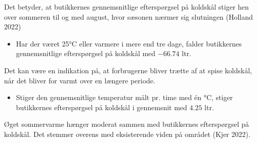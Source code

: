 \documentclass[
  12pt,
  a4paper,
  DIV=11,
  numbers=noendperiod]{scrartcl}
\providecommand{\tightlist}{%
  \setlength{\itemsep}{0pt}\setlength{\parskip}{0pt}}\usepackage{longtable,booktabs,array}
\begin{document}
Det betyder, at butikkernes gennemsnitlige efterspørgsel på koldskål
stiger hen over sommeren til og med august, hvor sæsonen nærmer sig
slutningen (Holland 2022)

\begin{itemize}
\tightlist
\item
  Har der været 25°C eller varmere i mere end tre dage, falder
  butikkernes gennemsnitlige efterspørgsel på koldskål med \(-66.74\)
  ltr.
\end{itemize}

Det kan være en indikation på, at forbrugerne bliver trætte af at spise
koldskål, når det bliver for varmt over en længere periode.

\begin{itemize}
\tightlist
\item
  Stiger den gennemsnitlige temperatur målt pr. time med én °C, stiger
  butikkernes efterspørgsel på koldskål i gennemsnit med \(4.25\) ltr.
\end{itemize}

Øget sommervarme hænger moderat sammen med butikkernes efterspørgsel på
koldskål. Det stemmer overens med eksisterende viden på området (Kjer
2022).
\end{document}
